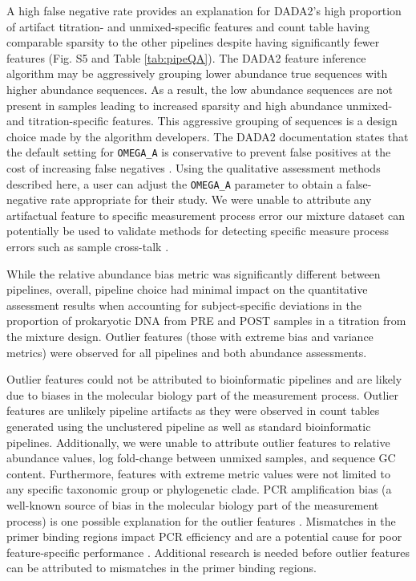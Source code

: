 \documentclass{bmcart}
\begin{document}
A high false negative rate provides an explanation for DADA2's high proportion
of artifact titration- and unmixed-specific features and count table having
comparable sparsity to the other pipelines despite having significantly fewer
features (Fig. S5 and Table \ref{tab:pipeQA}).
The DADA2 feature inference algorithm may be aggressively grouping
lower abundance true sequences with higher abundance sequences.
As a result, the low abundance sequences are not present in samples
leading to increased sparsity and high abundance unmixed- and titration-specific features.
This aggressive grouping of sequences is a design choice made by the algorithm developers.
The DADA2 documentation states that the default setting for \texttt{OMEGA\_A}
is conservative to prevent false positives at the cost of increasing false negatives \cite{callahan2016dada2}.
Using the qualitative assessment methods described here, a user can
adjust the \texttt{OMEGA\_A} parameter to obtain a false-negative rate appropriate for their study. 
We were unable to attribute any artifactual feature to specific measurement process error our mixture dataset can potentially be used to validate methods for detecting specific measure process errors such as sample cross-talk \cite{Edgar2018-ss}.

While the relative abundance bias metric was significantly different
between pipelines, overall, pipeline choice had minimal impact on the
quantitative assessment results when accounting for subject-specific deviations
in the proportion of prokaryotic DNA from PRE and POST samples in a
titration from the mixture design. Outlier features (those with extreme bias
and variance metrics) were observed for all pipelines and both abundance assessments.

Outlier features could not be attributed to bioinformatic pipelines
and are likely due to biases in the molecular biology part of the measurement process.
Outlier features are unlikely pipeline artifacts as they were observed in count tables generated
using the unclustered pipeline as well as standard bioinformatic
pipelines. Additionally, we were unable to attribute outlier features to relative
abundance values, log fold-change between unmixed samples, and sequence
GC content. Furthermore, features with extreme metric values were not limited to any
specific taxonomic group or phylogenetic clade. PCR amplification
bias (a well-known source of bias in the molecular biology part of the
measurement process) is one possible explanation for the outlier features \cite{Sze565598}.
Mismatches in the primer binding regions impact PCR efficiency
and are a potential cause for poor feature-specific
performance \cite{wright2014exploiting}. Additional research is
needed before outlier features can be attributed to mismatches in the primer binding regions.
\end{document}
